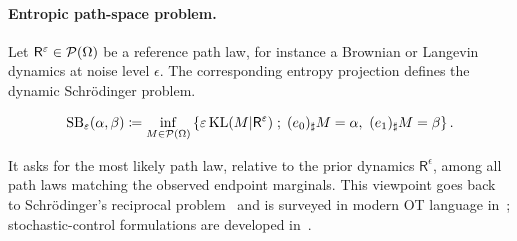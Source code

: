 \paragraph{Entropic path-space problem.}

Let $\mathsf R^\varepsilon\in\mathcal{P}(\Omega)$ be a reference path law, for instance a Brownian or Langevin dynamics at noise level $\epsilon$. The corresponding entropy projection defines the dynamic Schr\"odinger problem.
\begin{defn}\label{def-schrodinger-bridge}
\begin{equation}\label{eq-schrodinger-path-space}
	\mathrm{SB}_\varepsilon(\alpha,\beta)
	\coloneqq
	\inf_{M\in\mathcal{P}(\Omega)}
	\left\{ 
		\varepsilon\operatorname{KL}(M|\mathsf R^\varepsilon)
	 \;;\; 
		(e_0)_\sharp M=\alpha,\ (e_1)_\sharp M=\beta
	 \right\}.
\end{equation}
\end{defn}
It asks for the most likely path law, relative to the prior dynamics $\mathsf R^\epsilon$, among all path laws matching the observed endpoint marginals. This viewpoint goes back to Schr\"odinger's reciprocal problem~\cite{Schroedinger31} and is surveyed in modern OT language in~\cite{leonard2012schrodinger,LeonardSchroedinger}; stochastic-control formulations are developed in~\cite{chen2016relation}.

